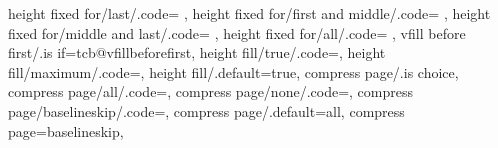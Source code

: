 {  height fixed for/last/.code={%
    \let\tcb@break@ch@first=\tcb@ch@natural%
    \let\tcb@break@ch@middle=\tcb@ch@natural%
    \let\tcb@break@ch@last=\tcb@break@ch@fixed},%
  height fixed for/first and middle/.code={%
    \let\tcb@break@ch@first=\tcb@break@ch@fixed%
    \let\tcb@break@ch@middle=\tcb@break@ch@fixed%
    \let\tcb@break@ch@last=\tcb@ch@natural},%
  height fixed for/middle and last/.code={%
    \let\tcb@break@ch@first=\tcb@ch@natural%
    \let\tcb@break@ch@middle=\tcb@break@ch@fixed%
    \let\tcb@break@ch@last=\tcb@break@ch@fixed},%
  height fixed for/all/.code={%
    \let\tcb@break@ch@first=\tcb@break@ch@fixed%
    \let\tcb@break@ch@middle=\tcb@break@ch@fixed%
    \let\tcb@break@ch@last=\tcb@break@ch@fixed},%
  vfill before first/.is if=tcb@vfillbeforefirst,%
  height fill/true/.code={\let\tcb@height@adjust\tcb@height@fill@unbroken@normal},%
  height fill/maximum/.code={\let\tcb@height@adjust\tcb@height@fill@unbroken@compressed},%
  height fill/.default=true,%
  compress page/.is choice,%
  compress page/all/.code={\def\tcb@comp@compress{\def\tcb@compress@height{\pageshrink-1sp}}},%
  compress page/none/.code={\def\tcb@comp@compress{\let\tcb@compress@height\tcb@zpt}},%
  compress page/baselineskip/.code={\def\tcb@comp@compress{%
    \ifdim\pageshrink>\baselineskip%
      \let\tcb@compress@height\baselineskip%
    \else%
      \def\tcb@compress@height{\pageshrink-1sp}%
    \fi}},%
  compress page/.default=all,%
  compress page=baselineskip,%
}



